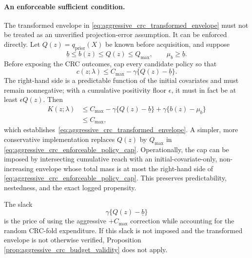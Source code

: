 \paragraph{An enforceable sufficient condition.}
The transformed envelope in
\eqref{eq:aggressive_crc_transformed_envelope} must not be treated as an
unverified projection-error assumption.  It can be enforced directly.  Let
$Q(z)=q_{\mathrm{prior}}(X)$ be known before acquisition, and suppose
\[
    \underline b\leq b(z)\leq Q(z)\leq Q_{\max},
    \qquad
    \mu_b\geq\underline b.
\]
Before exposing the CRC outcomes, cap every candidate policy so that
\begin{equation}
\label{eq:aggressive_crc_enforceable_policy_cap}
    c(z;\lambda)
    \leq
    C_{\max}-\gamma\{Q(z)-\underline b\}.
\end{equation}
The right-hand side is a predictable function of the initial covariates and
must remain nonnegative; with a cumulative positivity floor $\epsilon$, it
must in fact be at least $\epsilon Q(z)$.  Then
\begin{align*}
    K(z;\lambda)
    &\leq
    C_{\max}-\gamma\{Q(z)-\underline b\}
    +\gamma\{b(z)-\mu_b\} \\
    &\leq C_{\max},
\end{align*}
which establishes~\eqref{eq:aggressive_crc_transformed_envelope}.  A simpler,
more conservative implementation replaces $Q(z)$ by $Q_{\max}$ in
\eqref{eq:aggressive_crc_enforceable_policy_cap}.  Operationally, the cap can
be imposed by intersecting cumulative reach with an initial-covariate-only,
non-increasing envelope whose total mass is at most the right-hand side of
\eqref{eq:aggressive_crc_enforceable_policy_cap}.  This preserves
predictability, nestedness, and the exact logged propensity.

The slack
\[
    \gamma\{Q(z)-\underline b\}
\]
is the price of using the aggressive $+C_{\max}$ correction while accounting
for the random CRC-fold expenditure.  If this slack is not imposed and the
transformed envelope is not otherwise verified, Proposition
\ref{prop:aggressive_crc_budget_validity} does not apply.
